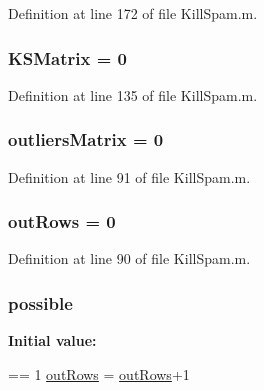 Definition at line 172 of file Kill\-Spam.\-m.

\hypertarget{a00023_aea43faf8d3d68de03c645edc96b0c1c0}{
\subsubsection[{K\-S\-Matrix}]{\setlength{\rightskip}{0pt plus 5cm}K\-S\-Matrix = 0}}\label{a00023_aea43faf8d3d68de03c645edc96b0c1c0}


Definition at line 135 of file Kill\-Spam.\-m.

\hypertarget{a00023_ad8a18b407726bf44299c9bcf5d1389ff}{
\subsubsection[{outliers\-Matrix}]{\setlength{\rightskip}{0pt plus 5cm}outliers\-Matrix = 0}}\label{a00023_ad8a18b407726bf44299c9bcf5d1389ff}


Definition at line 91 of file Kill\-Spam.\-m.

\hypertarget{a00023_a60cfb1ca20cbbc81b85a8f56658b7c99}{
\subsubsection[{out\-Rows}]{\setlength{\rightskip}{0pt plus 5cm}out\-Rows = 0}}\label{a00023_a60cfb1ca20cbbc81b85a8f56658b7c99}


Definition at line 90 of file Kill\-Spam.\-m.

\hypertarget{a00023_a07c9e68cdbafe572c04d3112d64deb88}{
\subsubsection[{possible}]{ possible}}\label{a00023_a07c9e68cdbafe572c04d3112d64deb88}
{\bfseries Initial value\-:}
\begin{DoxyCode}
== 1
            \hyperlink{a00023_a60cfb1ca20cbbc81b85a8f56658b7c99}{outRows} = \hyperlink{a00023_a60cfb1ca20cbbc81b85a8f56658b7c99}{outRows}+1
\end{DoxyCode}


